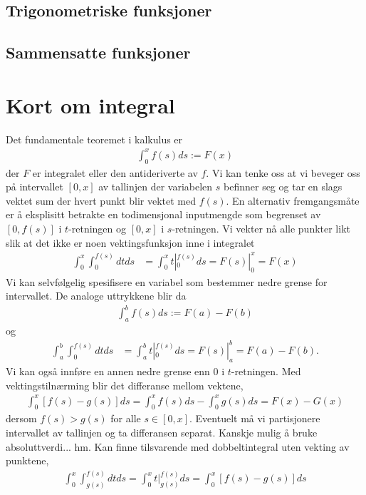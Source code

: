 \subsection{Trigonometriske funksjoner}
\subsection{Sammensatte funksjoner}
\section{Kort om integral}
Det fundamentale teoremet i kalkulus er 
\begin{align}
\int_0^xf(s)ds := F(x)
\end{align}
der $F$ er integralet eller den antideriverte av $f$. Vi kan tenke oss at vi beveger oss på intervallet $[0,x]$ av tallinjen der variabelen $s$ befinner seg og tar en slags vektet sum der hvert punkt blir vektet med $f(s)$. En alternativ fremgangsmåte er å eksplisitt betrakte en todimensjonal inputmengde som begrenset av $[0, f(s)]$ i $t$-retningen og $[0, x]$ i $s$-retningen. Vi vekter nå alle punkter likt slik at det ikke er noen vektingsfunksjon inne i integralet
\begin{align}
\int_0^x\int_0^{f(s)}dtds&=\int_0^x t|^{f(s)}_0ds =F(s)|^x_0 = F(x)
\end{align}
Vi kan selvfølgelig spesifisere en variabel som bestemmer nedre grense for intervallet. De analoge uttrykkene blir da
\begin{align}
\int_a^bf(s)ds := F(a)-F(b)
\end{align}
og
\begin{align}
\int_a^b\int_0^{f(s)}dtds&=\int_a^b t|^{f(s)}_0ds =F(s)|_a^b = F(a)-F(b).
\end{align}
Vi kan også innføre en annen nedre grense enn $0$ i $t$-retningen. Med vektingstilnærming blir det differanse mellom vektene,
\begin{align}
\int_0^x[f(s)-g(s)]ds = \int_0^xf(s)ds - \int_0^xg(s)ds = F(x)-G(x)
\end{align}
dersom $f(s)>g(s)$ for alle $s\in [0,x]$. Eventuelt må vi partisjonere intervallet av tallinjen og ta differansen separat. Kanskje mulig å bruke absoluttverdi... hm. Kan finne tilsvarende med dobbeltintegral uten vekting av punktene,
\begin{align}
\int_0^x\int_{g(s)}^{f(s)}dtds = \int_0^xt|_{g(s)}^{f(s)}ds=\int_0^x[f(s)-g(s)]ds
\end{align}
